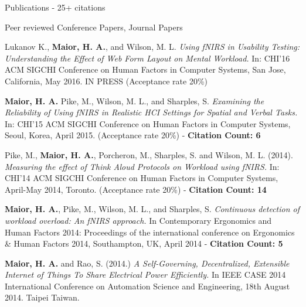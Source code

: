 \documentclass{resume} %
\begin{document}
\begin{rSection}{Publications - 25+ citations}
\begin{rSubsection}{ }{ }{ }{Peer reviewed Conference Papers, Journal Papers}
\item Lukanov K., \textbf{Maior, H. A.}, and Wilson, M. L. \emph{Using fNIRS in Usability Testing: Understanding the Effect of Web Form Layout on Mental Workload.} In: CHI'16 ACM SIGCHI Conference on Human Factors in Computer Systems, San Jose, California, May 2016. IN PRESS (Acceptance rate 20\%)

\item \textbf{Maior, H. A.} Pike, M., Wilson, M. L., and Sharples, S. \emph{Examining the Reliability of Using fNIRS in Realistic HCI Settings for Spatial and Verbal Tasks.} In: CHI'15 ACM SIGCHI Conference on Human Factors in Computer Systems, Seoul, Korea, April 2015. (Acceptance rate 20\%) - \textbf{Citation Count: 6}

\item Pike, M., \textbf{Maior, H. A.}, Porcheron, M., Sharples, S. and Wilson, M. L. (2014). \emph{Measuring the effect of Think Aloud Protocols on Workload using fNIRS.} In: CHI'14 ACM SIGCHI Conference on Human Factors in Computer Systems, April-May 2014, Toronto. (Acceptance rate 20\%) - \textbf{Citation Count: 14}
 
\item \textbf{Maior, H. A.}, Pike, M., Wilson, M. L., and Sharples, S. \emph{Continuous detection of workload overload: An fNIRS approach.} In Contemporary Ergonomics and Human Factors 2014: Proceedings of the international conference on Ergonomics \& Human Factors 2014, Southampton, UK, April 2014 - \textbf{Citation Count: 5}
    
\item \textbf{Maior, H. A.} and Rao, S. (2014.) \emph{A Self-Governing, Decentralized, Extensible Internet of Things To Share Electrical Power Efficiently.} In IEEE CASE 2014 International Conference on Automation Science and Engineering, 18th August 2014. Taipei Taiwan.


\end{rSubsection}


\end{rSection}
\end{document}
